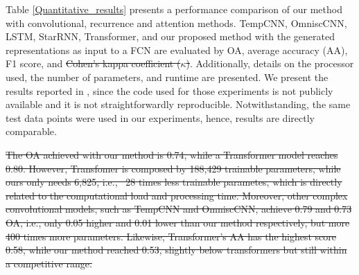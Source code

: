 \documentclass[journal,article,submit,pdftex,moreauthors]{Definitions/mdpi}
\providecommand{\DIFdel}[1]{{\protect\color{red}\sout{#1}}}                      %
\providecommand{\DIFaddend}{} %
\providecommand{\DIFdelbegin}{} %
\providecommand{\DIFdelend}{} %
\begin{document}
\DIFaddend %
Table \ref{Quantitative_results} presents a performance comparison of our method with convolutional, recurrence and attention methods. 
TempCNN, OmniscCNN, LSTM, StarRNN, Transformer, and our proposed method with the generated representations as input to a FCN are evaluated by OA, average accuracy (AA), F1 score, and \DIFdelbegin \DIFdel{Cohen's kappa coefficient (}\DIFdelend $\kappa$\DIFdelbegin \DIFdel{)}\DIFdelend . 
Additionally, details on the processor used, the number of parameters, and runtime are presented. 
We present the results reported in \cite{Russwurm2020}, since the code used for those experiments is not publicly available and it is not straightforwardly reproducible. 
Notwithstanding, the same test data points were used in our experiments, hence, results are directly comparable.

\DIFdelbegin \DIFdel{The OA achieved with our method is 0.74, while a Transformer model reaches 0.80. However, Transfomer is composed by 188,429 trainable parameters, while ours only needs 6,825, i.e., ~28 times less trainable parametes, which is directly related to the computational load and processing time. 
Moreover, other complex convolutional models, such as TempCNN and OmniscCNN, achieve 0.79 and 0.73 OA, i.e., only 0.05 higher and 0.01 lower than our method respectively, but more 400 times more parameters.
Likewise, Transformer's AA has the highest score 0.58, while our method reached 0.53, slightly below transformers but still within a competitive range.
}%
\end{document}
